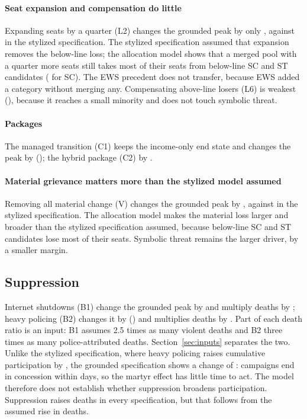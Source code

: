 \documentclass[11pt,a4paper]{article}
\begin{document}
\paragraph{Seat expansion and compensation do little} Expanding seats by a quarter (L2) changes the grounded peak by only \PeakChangeGroundedSeatExpansion{}, against \PeakChangeCentralSeatExpansion{} in the stylized specification. The stylized specification assumed that expansion removes the below-line loss; the allocation model shows that a merged pool with a quarter more seats still takes most of their seats from below-line SC and ST candidates (\AllocExpandedSCBelow{} for SC). The EWS precedent does not transfer, because EWS added a category without merging any. Compensating above-line losers (L6) is weakest (\PeakChangeGroundedCompensation), because it reaches a small minority and does not touch symbolic threat.

\paragraph{Packages} The managed transition (C1) keeps the income-only end state and changes the peak by \PeakChangeGroundedManagedTransition{} (\PeakChangeCIGroundedManagedTransition); the hybrid package (C2) by \PeakChangeGroundedHybridPackage.

\paragraph{Material grievance matters more than the stylized model assumed} Removing all material change (V) changes the grounded peak by \PeakChangeGroundedSymbolicOnlyValidation{}, against \PeakChangeCentralSymbolicOnlyValidation{} in the stylized specification. The allocation model makes the material loss larger and broader than the stylized specification assumed, because below-line SC and ST candidates lose most of their seats. Symbolic threat remains the larger driver, by a smaller margin.

\subsection{Suppression}
Internet shutdowns (B1) change the grounded peak by \PeakChangeGroundedInternetShutdown{} and multiply deaths by \DeathRatioGroundedInternetShutdown{}; heavy policing (B2) changes it by \PeakChangeGroundedHeavyPolicing{} (\PeakChangeCIGroundedHeavyPolicing) and multiplies deaths by \DeathRatioGroundedHeavyPolicing. Part of each death ratio is an input: B1 assumes 2.5 times as many violent deaths and B2 three times as many police-attributed deaths. Section~\ref{sec:inputs} separates the two. Unlike the stylized specification, where heavy policing raises cumulative participation by \CumulativeChangeCentralHeavyPolicing, the grounded specification shows a change of \CumulativeChangeGroundedHeavyPolicing: campaigns end in concession within days, so the martyr effect has little time to act. The model therefore does not establish whether suppression broadens participation. Suppression raises deaths in every specification, but that follows from the assumed rise in deaths.
\end{document}
